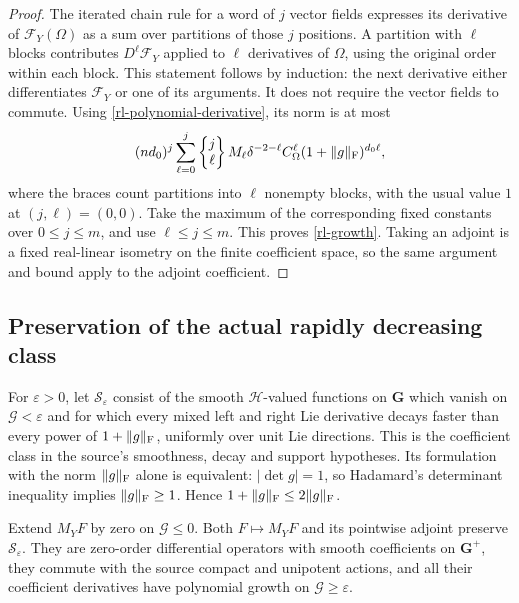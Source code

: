 \begin{proof}
The iterated chain rule for a word of $j$ vector fields
expresses its derivative of $\mathcal F_Y(\Omega)$
as a sum over partitions of those $j$ positions.
A partition with $\ell$ blocks contributes
$D^\ell\mathcal F_Y$ applied to $\ell$ derivatives
of $\Omega$, using the original order within each
block.  This statement follows by induction:
the next derivative either differentiates
$\mathcal F_Y$ or one of its arguments.
It does not require the vector fields to commute.
Using \eqref{rl-polynomial-derivative}, its norm is
at most
\[
 (nd_0)^j
 \sum_{\ell=0}^j
    \left\{\begin{matrix}j\\\ell\end{matrix}\right\}
       M_\ell\delta^{-2-\ell}C_\Omega^\ell
                    (1+\|g\|_{\rm F})^{d_0\ell},
\]
where the braces count partitions into $\ell$ nonempty
blocks, with the usual value $1$ at $(j,\ell)=(0,0)$.
Take the maximum of the corresponding fixed constants
over $0\leq j\leq m$, and use $\ell\leq j\leq m$.
This proves \eqref{rl-growth}.
Taking an adjoint is a fixed real-linear isometry
on the finite coefficient space, so the same argument
and bound apply to the adjoint coefficient.
\end{proof}

\subsection{Preservation of the actual rapidly decreasing class}

For $\varepsilon>0$, let $\mathscr S_\varepsilon$
consist of the smooth $\mathcal H$-valued functions
on $\mathbf G$ which vanish on $\mathcal G<\varepsilon$
and for which every mixed left and right Lie derivative
decays faster than every power of $1+\|g\|_{\rm F}$,
uniformly over unit Lie directions.
This is the coefficient class in the source's
smoothness, decay and support hypotheses.
Its formulation with the norm $\|g\|_{\rm F}$ alone
is equivalent: $|\det g|=1$, so Hadamard's determinant
inequality implies $\|g\|_{\rm F}\geq1$.
Hence $1+\|g\|_{\rm F}\leq2\|g\|_{\rm F}$.

\begin{corollary}\label{rl-class-preserved}
Extend $M_YF$ by zero on $\mathcal G\leq0$.
Both $F\mapsto M_YF$ and its pointwise adjoint
preserve $\mathscr S_\varepsilon$.
They are zero-order differential operators with
smooth coefficients on $\mathbf G^+$, they commute
with the source compact and unipotent actions, and
all their coefficient derivatives have polynomial
growth on $\mathcal G\geq\varepsilon$.
\end{corollary}

